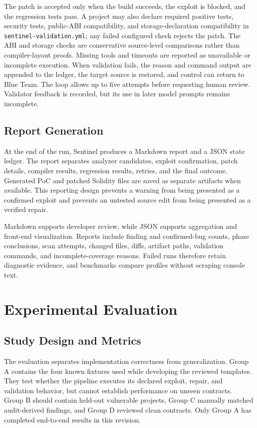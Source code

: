 \documentclass[conference,a4paper,10pt]{IEEEtran}
\newcommand{\code}[1]{\texttt{#1}}
\begin{document}
The patch is accepted only when the build succeeds, the exploit is blocked, and the regression tests pass. A project may also declare required positive tests, security tests, public-ABI compatibility, and storage-declaration compatibility in \code{sentinel-validation.yml}; any failed configured check rejects the patch. The ABI and storage checks are conservative source-level comparisons rather than compiler-layout proofs. Missing tools and timeouts are reported as unavailable or incomplete execution. When validation fails, the reason and command output are appended to the ledger, the target source is restored, and control can return to Blue Team. The loop allows up to five attempts before requesting human review. Validator feedback is recorded, but its use in later model prompts remains incomplete.

\subsection{Report Generation}
At the end of the run, Sentinel produces a Markdown report and a JSON state ledger. The report separates analyzer candidates, exploit confirmation, patch details, compiler results, regression results, retries, and the final outcome. Generated PoC and patched Solidity files are saved as separate artifacts when available. This reporting design prevents a warning from being presented as a confirmed exploit and prevents an untested source edit from being presented as a verified repair.

Markdown supports developer review, while JSON supports aggregation and front-end visualization. Reports include finding and confirmed-bug counts, phase conclusions, scan attempts, changed files, diffs, artifact paths, validation commands, and incomplete-coverage reasons. Failed runs therefore retain diagnostic evidence, and benchmarks compare profiles without scraping console text.

\section{Experimental Evaluation}
\subsection{Study Design and Metrics}
The evaluation separates implementation correctness from generalization. Group A contains the four known fixtures used while developing the reviewed templates. They test whether the pipeline executes its declared exploit, repair, and validation behavior, but cannot establish performance on unseen contracts. Group B should contain held-out vulnerable projects, Group C manually matched audit-derived findings, and Group D reviewed clean contracts. Only Group A has completed end-to-end results in this revision.
\end{document}
